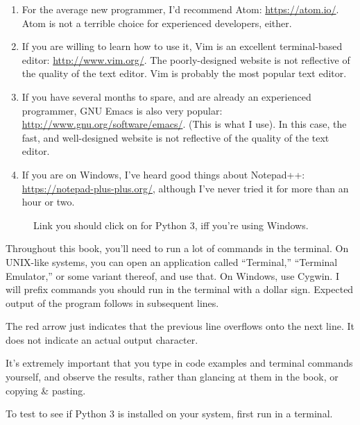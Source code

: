 \begin{enumerate}
\item For the average new programmer, I'd recommend Atom:
  \url{https://atom.io/}. Atom is not a terrible choice for
  experienced developers, either.
\item If you are willing to learn how to use it, Vim is an excellent
  terminal-based editor: \url{http://www.vim.org/}. The
  poorly-designed website is not reflective of the quality of the text
  editor. Vim is probably the most popular text editor.
\item If you have several months to spare, and are already an
  experienced programmer, GNU Emacs is also very popular:
  \url{http://www.gnu.org/software/emacs/}. (This is what I use). In
  this case, the fast, and well-designed website is not reflective of
  the quality of the text editor.
\item If you are on Windows, I've heard good things about Notepad++:
  \url{https://notepad-plus-plus.org/}, although I've never tried it
  for more than an hour or two.
\end{enumerate}

\begin{figure}[ht]
  \centering
  \caption{Link you should click on for Python 3, iff you're using
    Windows.}
  \label{fig:python3-windows}
\end{figure}

Throughout this book, you'll need to run a lot of commands in the
terminal. On UNIX-like systems, you can open an application called
``Terminal,'' ``Terminal Emulator,'' or some variant thereof, and use
that. On Windows, use Cygwin. I will prefix commands you should run in
the terminal with a dollar sign. Expected output of the program
follows in subsequent lines.


\begin{remark}
  The red arrow just indicates that the previous line overflows onto
  the next line. It does not indicate an actual output character.
\end{remark}

\begin{remark}
  It's extremely important that you type in code examples and
  terminal commands yourself, and observe the results, rather than
  glancing at them in the book, or copying \& pasting.
\end{remark}

To test to see if Python 3 is installed on your system, first run
 in a terminal.

